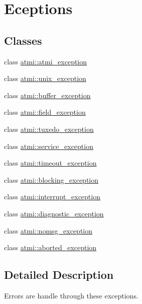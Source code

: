 \hypertarget{group__errors}{\section{Eceptions}
\label{group__errors}
}
\subsection*{Classes}
\begin{DoxyCompactItemize}
\item 
class \hyperlink{classatmi_1_1atmi__exception}{atmi\+::atmi\+\_\+exception}
\item 
class \hyperlink{classatmi_1_1unix__exception}{atmi\+::unix\+\_\+exception}
\item 
class \hyperlink{classatmi_1_1buffer__exception}{atmi\+::buffer\+\_\+exception}
\item 
class \hyperlink{classatmi_1_1field__exception}{atmi\+::field\+\_\+exception}
\item 
class \hyperlink{classatmi_1_1tuxedo__exception}{atmi\+::tuxedo\+\_\+exception}
\item 
class \hyperlink{classatmi_1_1service__exception}{atmi\+::service\+\_\+exception}
\item 
class \hyperlink{classatmi_1_1timeout__exception}{atmi\+::timeout\+\_\+exception}
\item 
class \hyperlink{classatmi_1_1blocking__exception}{atmi\+::blocking\+\_\+exception}
\item 
class \hyperlink{classatmi_1_1interrupt__exception}{atmi\+::interrupt\+\_\+exception}
\item 
class \hyperlink{classatmi_1_1diagnostic__exception}{atmi\+::diagnostic\+\_\+exception}
\item 
class \hyperlink{classatmi_1_1nomsg__exception}{atmi\+::nomsg\+\_\+exception}
\item 
class \hyperlink{classatmi_1_1aborted__exception}{atmi\+::aborted\+\_\+exception}
\end{DoxyCompactItemize}


\subsection{Detailed Description}
Errors are handle through these exceptions. 